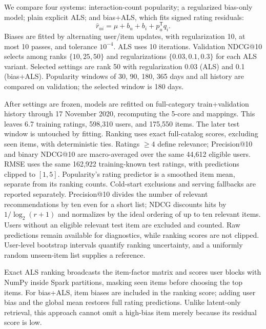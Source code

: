 \documentclass[10pt,a4paper]{article}
\begin{document}
We compare four systems: interaction-count popularity; a regularized bias-only
model; plain explicit ALS; and bias+ALS, which fits signed rating residuals:
\[
  \widehat r_{ui}=\mu+b_u+b_i+p_u^{\mathsf T}q_i.
\]
Biases are fitted by alternating user/item updates, with regularization 10,
at most 10 passes, and tolerance $10^{-4}$. ALS uses 10 iterations. Validation
NDCG@10 selects among ranks $\{10,25,50\}$ and regularizations
$\{0.03,0.1,0.3\}$ for each ALS variant. Selected settings are rank 50 with
regularization 0.03 (ALS) and 0.1 (bias+ALS). Popularity windows of 30, 90, 180,
365 days and all history are compared on validation; the selected window is 180 days.

After settings are frozen, models are refitted on full-category train+validation
history through 17 November 2020, recomputing the 5-core and mappings. This leaves
6.7 training ratings, 598,310 users, and 175,550 items. The later test window
is untouched by fitting. Ranking uses exact full-catalog scores, excluding seen
items, with deterministic ties. Ratings $\geq4$ define relevance; Precision@10
and binary NDCG@10 are macro-averaged over the same 44,612 eligible users. RMSE
uses the same 162,922 training-known test ratings, with predictions clipped to
$[1,5]$. Popularity's rating predictor is a smoothed item mean, separate from its
ranking counts. Cold-start exclusions and serving fallbacks are reported separately.
Precision@10 divides the number of relevant recommendations by ten even for a
short list; NDCG discounts hits by $1/\log_2(r+1)$ and normalizes by the ideal
ordering of up to ten relevant items. Users without an eligible relevant test
item are excluded and counted. Raw predictions remain available for diagnostics,
while ranking scores are not clipped. User-level bootstrap intervals quantify
ranking uncertainty, and a uniformly random unseen-item list supplies a reference.

Exact ALS ranking broadcasts the item-factor matrix and scores user blocks with
NumPy inside Spark partitions, masking seen items before choosing the top items.
For bias+ALS, item biases are included in the ranking score; adding user bias and
the global mean restores full rating predictions. Unlike latent-only retrieval,
this approach cannot omit a high-bias item merely because its residual score is low.

\newpage
\end{document}
